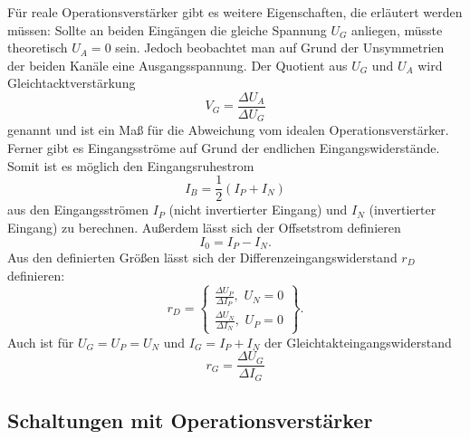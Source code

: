 Für reale Operationsverstärker gibt es weitere Eigenschaften, die erläutert werden müssen:
Sollte an beiden Eingängen die gleiche Spannung $U_G$ anliegen, müsste theoretisch $U_A = 0$ sein. Jedoch beobachtet man auf Grund der Unsymmetrien der beiden Kanäle eine Ausgangsspannung.
Der Quotient aus $U_G$ und $U_A$ wird Gleichtacktverstärkung
\begin{equation}
V_G = \frac{\Delta U_A}{\Delta U_G}
\end{equation}
genannt und ist ein Maß für die Abweichung vom idealen Operationsverstärker.
Ferner gibt es Eingangsströme auf Grund der endlichen Eingangswiderstände. Somit ist es möglich den Eingangsruhestrom
\begin{equation}
I_B = \frac{1}{2} (I_P + I_N)
\end{equation}
aus den Eingangsströmen $I_P$ (nicht invertierter Eingang) und $I_N$ (invertierter Eingang) zu berechnen.
Außerdem lässt sich der Offsetstrom definieren
\begin{equation}
I_0 = I_P - I_N.
\end{equation}
Aus den definierten Größen lässt sich der Differenzeingangswiderstand $r_D$ definieren:
\begin{equation}
r_D = \left\{\begin{array}{ll} \frac{\Delta U_P}{\Delta I_P}, \, \, U_N = 0\\
	  \frac{\Delta U_N}{\Delta I_N}, \, \, U_P = 0\end{array}\right\}.
\end{equation}
Auch ist für $U_G = U_P = U_N$ und $I_G = I_P + I_N$ der Gleichtakteingangswiderstand
\begin{equation}
r_G = \frac{\Delta U_G}{\Delta I_G}
\end{equation}

\subsection{Schaltungen mit Operationsverst{\"a}rker}

